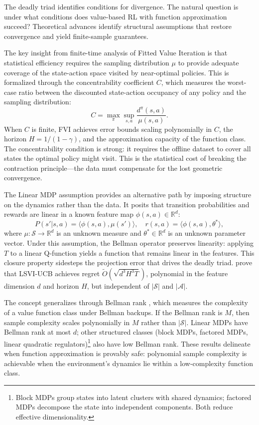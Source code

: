The deadly triad identifies conditions for divergence. The natural question is under what conditions does value-based RL with function approximation succeed? Theoretical advances identify structural assumptions that restore convergence and yield finite-sample guarantees.

The key insight from finite-time analysis of Fitted Value Iteration \citep{MunosSzepesvari2008} is that statistical efficiency requires the sampling distribution $\mu$ to provide adequate coverage of the state-action space visited by near-optimal policies. This is formalized through the concentrability coefficient $C$, which measures the worst-case ratio between the discounted state-action occupancy of any policy and the sampling distribution:
\begin{equation}
C = \max_{\pi} \sup_{s,a} \frac{d^\pi(s,a)}{\mu(s,a)}.
\end{equation}
When $C$ is finite, FVI achieves error bounds scaling polynomially in $C$, the horizon $H = 1/(1-\gamma)$, and the approximation capacity of the function class. The concentrability condition is strong: it requires the offline dataset to cover all states the optimal policy might visit. This is the statistical cost of breaking the contraction principle---the data must compensate for the lost geometric convergence.

The Linear MDP assumption \citep{jin2020} provides an alternative path by imposing structure on the dynamics rather than the data. It posits that transition probabilities and rewards are linear in a known feature map $\phi(s,a) \in \mathbb{R}^d$:
\begin{equation}
P(s'|s,a) = \langle \phi(s,a), \mu(s') \rangle, \quad r(s,a) = \langle \phi(s,a), \theta^* \rangle,
\end{equation}
where $\mu: \mathcal{S} \to \mathbb{R}^d$ is an unknown measure and $\theta^* \in \mathbb{R}^d$ is an unknown parameter vector. Under this assumption, the Bellman operator preserves linearity: applying $T$ to a linear Q-function yields a function that remains linear in the features. This closure property sidesteps the projection error that drives the deadly triad. \citet{jin2020} prove that LSVI-UCB achieves regret $\tilde{O}(\sqrt{d^3 H^3 T})$, polynomial in the feature dimension $d$ and horizon $H$, but independent of $|\mathcal{S}|$ and $|\mathcal{A}|$.

The concept generalizes through Bellman rank \citep{Jiang2017}, which measures the complexity of a value function class under Bellman backups. If the Bellman rank is $M$, then sample complexity scales polynomially in $M$ rather than $|\mathcal{S}|$. Linear MDPs have Bellman rank at most $d$; other structured classes (block MDPs, factored MDPs, linear quadratic regulators)\footnote{Block MDPs group states into latent clusters with shared dynamics; factored MDPs decompose the state into independent components. Both reduce effective dimensionality.} also have low Bellman rank. These results delineate when function approximation is provably safe: polynomial sample complexity is achievable when the environment's dynamics lie within a low-complexity function class.

